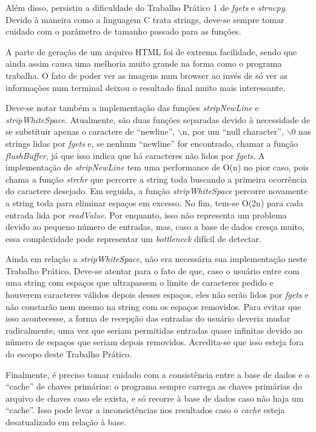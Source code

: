 \documentclass{article}
\begin{document}
Além disso, persistiu a dificuldade do Trabalho Prático 1 de \textit{fgets} e \textit{strncpy}. Devido à maneira como a linguagem C trata strings, deve-se sempre tomar cuidado com o parâmetro de tamanho passado para as funções.

A parte de geração de um arquivo HTML foi de extrema facilidade, sendo que ainda assim causa uma melhoria muito grande na forma como o programa trabalha. O fato de poder ver as imagens num browser ao invés de só ver as informações num terminal deixou o resultado final muito mais interessante.

Deve-se notar também a implementação das funções \textit{stripNewLine} e \textit{stripWhiteSpace}. Atualmente, são duas funções separadas devido à necessidade de se substituir apenas o caractere de ``newline'', $\backslash$n, por um ``null character'', $\backslash$0 nas strings lidas por \textit{fgets} e, se nenhum ``newline'' for encontrado, chamar a função \textit{flushBuffer}, já que isso indica que há caracteres não lidos por \textit{fgets}. A implementação de \textit{stripNewLine} tem uma performance de O(n) no pior caso, pois chama a função \textit{strchr} que percorre a string toda buscando a primeira ocorrência do caractere desejado. Em seguida, a função \textit{stripWhiteSpace} percorre novamente a string toda para eliminar espaços em excesso. No fim, tem-se O(2n) para cada entrada lida por \textit{readValue}. Por enquanto, isso não representa um problema devido ao pequeno número de entradas, mas, caso a base de dados cresça muito, essa complexidade pode representar um \textit{bottleneck} difícil de detectar.

Ainda em relação a \textit{stripWhiteSpace}, não era necessária sua implementação neste Trabalho Prático. Deve-se atentar para o fato de que, caso o usuário entre com uma string com espaços que ultrapassem o limite de caracteres pedido e houverem caracteres válidos depois desses espaços, eles não serão lidos por \textit{fgets} e não constarão nem mesmo na string com os espaços removidos. Para evitar que isso acontecesse, a forma de recepção das entradas do usuário deveria mudar radicalmente, uma vez que seriam permitidas entradas quase infinitas devido ao número de espaços que seriam depois removidos. Acredita-se que isso esteja fora do escopo deste Trabalho Prático.

Finalmente, é preciso tomar cuidado com a consistência entre a base de dados e o ``cache'' de chaves primárias: o programa sempre carrega as chaves primárias do arquivo de chaves caso ele exista, e só recorre à base de dados caso não haja um ``cache''. Isso pode levar a inconsistências nos resultados caso o \textit{cache} esteja desatualizado em relação à base.
\end{document}

